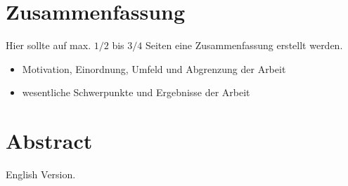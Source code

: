 
\section*{Zusammenfassung}
Hier sollte auf max. $1/2$ bis $3/4$ Seiten eine Zusammenfassung erstellt werden. 
\begin{itemize}
	\item Motivation, Einordnung, Umfeld und Abgrenzung der Arbeit
	\item wesentliche Schwerpunkte und Ergebnisse der Arbeit
\end{itemize}
\vspace{0.5cm}

\section*{Abstract}
English Version.
